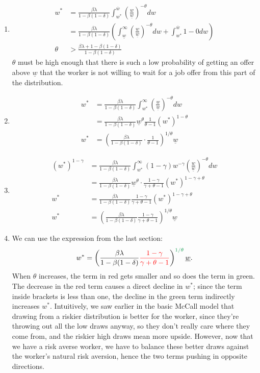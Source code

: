 \documentclass[11pt]{article}
\newcommand{\gr}{\textcolor{ForestGreen}}
\newcommand{\rd}{\textcolor{red}}
\begin{document}
\begin{enumerate}
\item
\begin{align*}
w^* &= \frac{\beta \lambda}{1 - \beta(1 - \delta)} \int^{\overline{w}}_{w^*} \left(\frac{w}{\underline{w}}\right)^{- \theta} dw \\
&= \frac{\beta \lambda}{1 - \beta (1 - \delta)} \left(\int^\infty_{\underline{w}}\left(\frac{w}{\underline{w}}\right)^{- \theta} dw + \int^{\overline{w}}_{w^*} 1 - 0 dw\right)\\
\theta &> \frac{\beta \lambda + 1 - \beta (1 - \delta)}{1 - \beta (1 - \delta)}
\end{align*}
$\theta$ must be high enough that there is such a low probability of getting an offer above $\underline{w}$ that the worker is not willing to wait for a job offer from this part of the distribution.
\item
\begin{align*}
w^* &= \frac{\beta \lambda}{1 - \beta (1 - \delta)} \int^\infty_{w^*} \left(\frac{w}{\underline{w}}\right)^{- \theta}dw \\ 
&= \frac{\beta \lambda}{1 - \beta(1 - \delta)} \underline{w}^\theta \frac{1}{\theta - 1} (w^*)^{1 - \theta}\\
w^* &= \left(\frac{\beta \lambda}{1 - \beta(1 - \delta)} \cdot \frac{1}{\theta - 1}\right)^{1 / \theta} \underline{w}
\end{align*}
\item
\begin{align*}
(w^*)^{1 - \gamma} &= \frac{\beta \lambda}{1 - \beta (1 - \delta)} \int^\infty_{w^*} (1 - \gamma) w^{- \gamma} \left(\frac{w}{\underline{w}}\right)^{- \theta} dw \\
&= \frac{\beta \lambda}{1 - \beta (1 - \delta)} \underline{w}^\theta \cdot \frac{1 - \gamma}{\gamma + \theta - 1} (w^*)^{1 - \gamma + \theta}\\
w^* &= \frac{\beta \lambda}{1 - \beta(1 - \delta)} \frac{1 - \gamma}{\gamma + \theta - 1} (w^*)^{1 - \gamma + \theta}\\
w^* &= \left(\frac{\beta \lambda}{1 - \beta (1 - \delta)} \frac{1 - \gamma}{\gamma + \theta - 1}\right)^{1 / \theta} \underline{w}
\end{align*}
\item
We can use the expression from the last section:
\[
w^* = \left(\frac{\beta \lambda}{1 - \beta (1 - \delta)} \rd{\frac{1 - \gamma}{\gamma + \theta - 1}}\right)^{\gr{1 / \theta}} \underline{w}.
\]
When $\theta$ increases, the term in red gets smaller and so does the term in green. The decrease in the red term causes a direct decline in $w^*$; since the term inside brackets is less than one, the decline in the green term indirectly increases $w^*$. Intuitively, we saw earlier in the basic McCall model that drawing from a riskier distribution is better for the worker, since they're throwing out all the low draws anyway, so they don't really care where they come from, and the riskier high draws mean more upside. However, now that we have a risk averse worker, we have to balance these better draws against the worker's natural risk aversion, hence the two terms pushing in opposite directions.
\end{enumerate}
\end{document}
